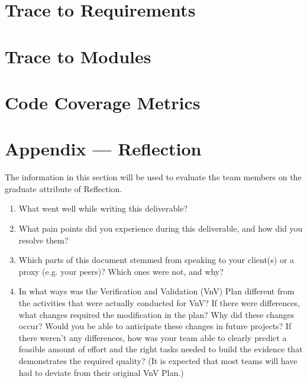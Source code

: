 \documentclass[12pt, titlepage]{article}
\begin{document}
\section{Trace to Requirements}
		
\section{Trace to Modules}		

\section{Code Coverage Metrics}






\newpage{}
\section*{Appendix --- Reflection}

The information in this section will be used to evaluate the team members on the
graduate attribute of Reflection.



\begin{enumerate}
  \item What went well while writing this deliverable? 
  \item What pain points did you experience during this deliverable, and how
    did you resolve them?
  \item Which parts of this document stemmed from speaking to your client(s) or
  a proxy (e.g. your peers)? Which ones were not, and why?
  \item In what ways was the Verification and Validation (VnV) Plan different
  from the activities that were actually conducted for VnV?  If there were
  differences, what changes required the modification in the plan?  Why did
  these changes occur?  Would you be able to anticipate these changes in future
  projects?  If there weren't any differences, how was your team able to clearly
  predict a feasible amount of effort and the right tasks needed to build the
  evidence that demonstrates the required quality?  (It is expected that most
  teams will have had to deviate from their original VnV Plan.)
\end{enumerate}
\end{document}
